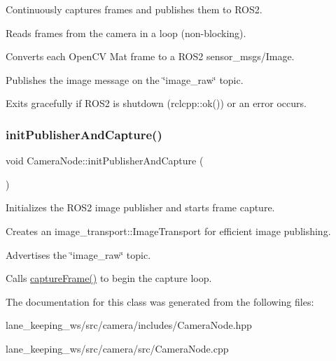 Continuously captures frames and publishes them to R\+O\+S2. 


\begin{DoxyItemize}
\item Reads frames from the camera in a loop (non-\/blocking).
\item Converts each Open\+CV {\ttfamily Mat} frame to a R\+O\+S2 {\ttfamily sensor\+\_\+msgs/\+Image}.
\item Publishes the image message on the \char`\"{}image\+\_\+raw\char`\"{} topic.
\item Exits gracefully if R\+O\+S2 is shutdown ({\ttfamily rclcpp\+::ok()}) or an error occurs. 
\end{DoxyItemize}\mbox{\label{classCameraNode_ae82e95951417f976eed687ddf64c6d9f}} 
\subsubsection{\texorpdfstring{init\+Publisher\+And\+Capture()}{initPublisherAndCapture()}}
{\footnotesize\ttfamily void Camera\+Node\+::init\+Publisher\+And\+Capture (\begin{DoxyParamCaption}{ }\end{DoxyParamCaption})\hspace{0.3cm}{\ttfamily [private]}}



Initializes the R\+O\+S2 image publisher and starts frame capture. 


\begin{DoxyItemize}
\item Creates an {\ttfamily image\+\_\+transport\+::\+Image\+Transport} for efficient image publishing.
\item Advertises the \char`\"{}image\+\_\+raw\char`\"{} topic.
\item Calls {\ttfamily \hyperlink{classCameraNode_a1a44c8d8757a75cf649cbcf49cfa1ca1}{capture\+Frame()}} to begin the capture loop. 
\end{DoxyItemize}

The documentation for this class was generated from the following files\+:\begin{DoxyCompactItemize}
\item 
lane\+\_\+keeping\+\_\+ws/src/camera/includes/Camera\+Node.\+hpp\item 
lane\+\_\+keeping\+\_\+ws/src/camera/src/Camera\+Node.\+cpp\end{DoxyCompactItemize}
